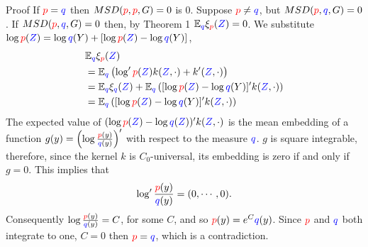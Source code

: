 \begin{frame}
\begin{columns}
\begin{column}{.33\linewidth}
\vspace{-0.75cm}
\begin{block}{Proof}
 If ${ \color{red} p}={ \color{blue} q}$ then $MSD({\color{red} p},{ \color{red} p},G) =0$ is $0$. Suppose
${ \color{red} p}\neq { \color{blue} q}$, but $MSD({\color{red} p},{ \color{blue} q},G) =0$. If $MSD({\color{red} p},{ \color{blue} q},G) =0$ then, by Theorem 1 
$\mathbb{E}_{{ \color{blue} q}}\xi_{{ \color{red} p}}({ \color{blue} Z})=0$. We substitute $\log { \color{red} p}({ \color{blue} Z})=\log { \color{blue} q}(Y)+[\log { \color{red} p}({ \color{blue} Z})-\log { \color{blue} q}(Y)]$,
\begin{align*}
 & \mathbb{E}_{{ \color{blue} q}}\xi_{{ \color{red} p}}({ \color{blue} Z})\\
 & =\mathbb{E}_{{ \color{blue} q}}\left( \log' { \color{red} p}({ \color{blue} Z})k({ \color{blue} Z},\cdot)+ k'({ \color{blue} Z},\cdot)\right)\\
 & =\mathbb{E}_{{ \color{blue} q}}\xi_{{ \color{blue} q}}({ \color{blue} Z})+\mathbb{E}_{{ \color{blue} q}}\left([\log { \color{red} p}({ \color{blue} Z})-\log { \color{blue} q}(Y)]'k({ \color{blue} Z},\cdot)\right)\\
 & =\mathbb{E}_{{ \color{blue} q}}\left( [\log { \color{red} p}({ \color{blue} Z})-\log { \color{blue} q}(Y)]' k({ \color{blue} Z},\cdot)\right)
\end{align*}
The expected value of $(\log { \color{red} p}({ \color{blue} Z})-\log { \color{blue} q}({ \color{blue} Z}))' k({ \color{blue} Z},\cdot)$ is the mean embedding of
a function $g(y)=\left(\log\frac{{ \color{red} p}(y)}{{ \color{blue} q}(y)}\right)'$ with respect
to the measure ${ \color{blue} q}$.  $g$ is square integrable,
therefore, since the kernel $k$ is $C_0$-universal, %
its embedding is zero if and only if $g=0$. This implies that 
\[
\log'\frac{{ \color{red} p}(y)}{{ \color{blue} q}(y)}=(0,\cdots,0).
\]
Consequently  $\log\frac{{ \color{red} p}(y)}{{ \color{blue} q}(y)}=C$, for some $C$, and so  ${ \color{red} p}(y)=e^{C}{ \color{blue} q}(y)$. Since ${ \color{red} p}$ and ${ \color{blue} q}$ both integrate
to one, $C=0$ then ${ \color{red} p}={ \color{blue} q}$, which is a contradiction.
\end{block}


\end{column}
\end{columns}
\end{frame}
